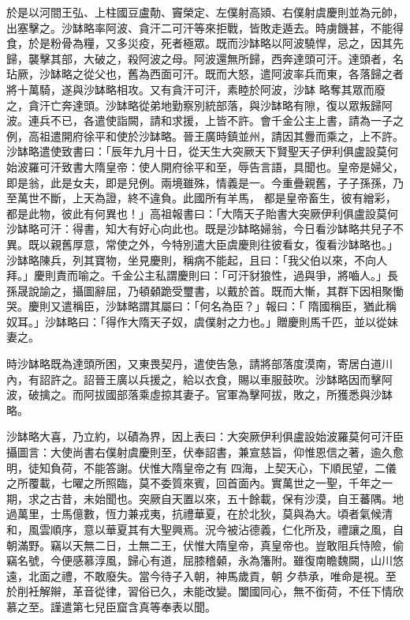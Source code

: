 \begin{pinyinscope}
 於是以河間王弘、上柱國豆盧勣、竇榮定、左僕射高熲、右僕射虞慶則並為元帥，出塞擊之。沙缽略率阿波、貪汗二可汗等來拒戰，皆敗走遁去。時虜饑甚，不能得食，於是粉骨為糧，又多災疫，死者極眾。既而沙缽略以阿波驍悍，忌之，因其先歸，襲擊其部，大破之，殺阿波之母。阿波還無所歸，西奔達頭可汗。達頭者，名玷厥，沙缽略之從父也，舊為西面可汗。既而大怒，遣阿波率兵而東，各落歸之者將十萬騎，遂與沙缽略相攻。又有貪汗可汗，素睦於阿波，沙缽
 略奪其眾而廢之，貪汗亡奔達頭。沙缽略從弟地勤察別統部落，與沙缽略有隙，復以眾叛歸阿波。連兵不已，各遣使詣闕，請和求援，上皆不許。會千金公主上書，請為一子之例，高祖遣開府徐平和使於沙缽略。晉王廣時鎮並州，請因其釁而乘之，上不許。沙缽略遣使致書曰：「辰年九月十日，從天生大突厥天下賢聖天子伊利俱盧設莫何始波羅可汗致書大隋皇帝：使人開府徐平和至，辱告言語，具聞也。皇帝是婦父，即是翁，此是女夫，即是兒例。兩境雖殊，情義是一。今重疊親舊，子子孫孫，乃至萬世不斷，上天為證，終不違負。此國所有羊馬，
 都是皇帝畜生，彼有繒彩，都是此物，彼此有何異也！」高祖報書曰：「大隋天子貽書大突厥伊利俱盧設莫何沙缽略可汗：得書，知大有好心向此也。既是沙缽略婦翁，今日看沙缽略共兒子不異。既以親舊厚意，常使之外，今特別遣大臣虞慶則往彼看女，復看沙缽略也。」沙缽略陳兵，列其寶物，坐見慶則，稱病不能起，且曰：「我父伯以來，不向人拜。」慶則責而喻之。千金公主私謂慶則曰：「可汗豺狼性，過與爭，將嚙人。」長孫晟說諭之，攝圖辭屈，乃頓顙跪受璽書，以戴於首。既而大慚，其群下因相聚慟哭。慶則又遣稱臣，沙缽略謂其屬曰：「何名為臣？」報曰：「
 隋國稱臣，猶此稱奴耳。」沙缽略曰：「得作大隋天子奴，虞僕射之力也。」贈慶則馬千匹，並以從妹妻之。



 時沙缽略既為達頭所困，又東畏契丹，遣使告急，請將部落度漠南，寄居白道川內，有詔許之。詔晉王廣以兵援之，給以衣食，賜以車服鼓吹。沙缽略因而擊阿波，破擒之。而阿拔國部落乘虛掠其妻子。官軍為擊阿拔，敗之，所獲悉與沙缽略。



 沙缽略大喜，乃立約，以磧為界，因上表曰：大突厥伊利俱盧設始波羅莫何可汗臣攝圖言：大使尚書右僕射虞慶則至，伏奉詔書，兼宣慈旨，仰惟恩信之著，逾久愈明，徒知負荷，不能答謝。伏惟大隋皇帝之有
 四海，上契天心，下順民望，二儀之所覆載，七曜之所照臨，莫不委質來賓，回首面內。實萬世之一聖，千年之一期，求之古昔，未始聞也。突厥自天置以來，五十餘載，保有沙漠，自王蕃隅。地過萬里，士馬億數，恆力兼戎夷，抗禮華夏，在於北狄，莫與為大。頃者氣候清和，風雲順序，意以華夏其有大聖興焉。況今被沾德義，仁化所及，禮讓之風，自朝滿野。竊以天無二日，土無二王，伏惟大隋皇帝，真皇帝也。豈敢阻兵恃險，偷竊名號，今便感慕淳風，歸心有道，屈膝稽顙，永為籓附。雖復南瞻魏闕，山川悠遠，北面之禮，不敢廢失。當今待子入朝，神馬歲貢，朝
 夕恭承，唯命是視。至於削衽解辮，革音從律，習俗已久，未能改變。闔國同心，無不銜荷，不任下情欣慕之至。謹遣第七兒臣窟含真等奉表以聞。




\end{pinyinscope}
